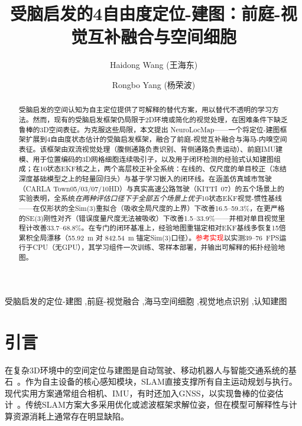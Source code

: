 \documentclass[review,12pt]{elsarticle}
\begin{document}
\begin{frontmatter}

\title{受脑启发的4自由度定位-建图：前庭-视觉互补融合与空间细胞}

\author[hutb]{Haidong Wang (王海东)}
\author[hutb]{Rongbo Yang (杨荣波)}


\begin{abstract}
    \sloppy
    受脑启发的空间认知为自主定位提供了可解释的替代方案，用以替代不透明的学习方法。然而，现有的受脑启发框架仍局限于2D环境或简化的视觉处理，在困难条件下缺乏鲁棒的3D空间表征。为克服这些局限，本文提出 NeuroLocMap——一个将定位-建图框架扩展到4自由度状态估计的受脑启发框架，融合了前庭-视觉互补融合与海马-内嗅空间表征。该框架由双流视觉处理（腹侧通路负责识别、背侧通路负责运动）、前庭IMU建模、用于位置编码的3D网格细胞连续吸引子，以及用于闭环检测的经验式认知建图组成；在10状态EKF核之上，两个高层校正补全系统：在线的、仅尺度的单目校正（冻结深度基础模型之上的轻量回归头）与基于学习嵌入的闭环线。在涵盖仿真城市驾驶（CARLA Town05/03/07/10HD）与真实高速公路驾驶（KITTI~07）的五个场景上的实验表明，全系统\emph{在两种评估口径下于全部五个场景上优于}10状态EKF视觉-惯性基线——在仅形状的全Sim(3)重拟合（吸收全局尺度的上界）下改善16.5--59.3\%，在更严格的SE(3)刚性对齐（错误度量尺度无法被吸收）下改善1.5--33.9\%——并相对单目视觉里程计改善33.7--68.8\%。在专门的闭环基准上，经验地图重锚定相对EKF基线多恢复15倍累积全局漂移（55.92~m 对 842.54~m 锚定Sim(3)口径）。\textcolor{red}{参考实现}以实测39--76~FPS运行于CPU（无GPU），其学习组件一次训练、零样本部署，并输出可解释的拓扑经验地图。
\end{abstract}

\begin{keyword}
受脑启发的定位-建图 \sep 前庭-视觉融合 \sep 海马空间细胞 \sep 视觉地点识别 \sep 认知建图
\end{keyword}

\end{frontmatter}

\section{引言}
\label{sec:intro}

在复杂3D环境中的空间定位与建图是自动驾驶、移动机器人与智能交通系统的基石~\cite{cadena2016past}。作为自主设备的核心感知模块，SLAM直接支撑所有自主运动规划与执行。现代实用方案通常组合相机、IMU，有时还加入GNSS，以实现鲁棒的位姿估计~\cite{saputra2018visual}。传统SLAM方案大多采用优化或滤波框架求解位姿，但在模型可解释性与计算资源消耗上通常存在明显缺陷。
\end{document}
